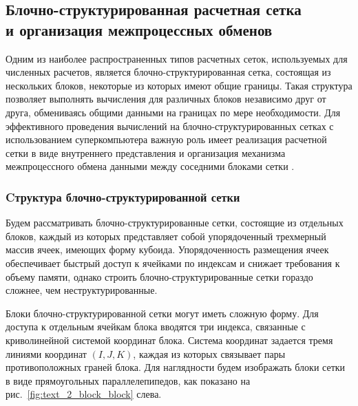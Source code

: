 \subsection{Блочно-структурированная расчетная сетка \\ и организация межпроцессных обменов}

Одним из наиболее распространенных типов расчетных сеток, используемых для численных расчетов, является блочно-структурированная сетка\label{term:mesh_block_struct2}, состоящая из нескольких блоков, некоторые из которых имеют общие границы.
Такая структура позволяет выполнять вычисления для различных блоков независимо друг от друга, обмениваясь общими данными на границах по мере необходимости.
Для эффективного проведения вычислений на блочно-структурированных сетках с использованием суперкомпьютера важную роль имеет реализация расчетной сетки в виде внутреннего представления и организация механизма межпроцессного обмена данными между соседними блоками сетки \cite{Rybakov2017Mesh}.

\subsubsection{Cтруктура блочно-структурированной сетки}

Будем рассматривать блочно-структурированные сетки, состоящие из отдельных блоков, каждый из которых представляет собой упорядоченный трехмерный массив ячеек, имеющих форму кубоида.
Упорядоченность размещения ячеек обеспечивает быстрый доступ к ячейками по индексам и снижает требования к объему памяти, однако строить блочно-структурированные сетки гораздо сложнее, чем неструктурированные.

Блоки блочно-структурированной сетки могут иметь сложную форму.
Для доступа к отдельным ячейкам блока вводятся три индекса, связанные с криволинейной системой координат блока.
Система координат задается тремя линиями координат $(I, J, K)$, каждая из которых связывает пары противоположных граней блока.
Для наглядности будем изображать блоки сетки в виде прямоугольных параллелепипедов, как показано на рис.~\ref{fig:text_2_block_block} слева.


